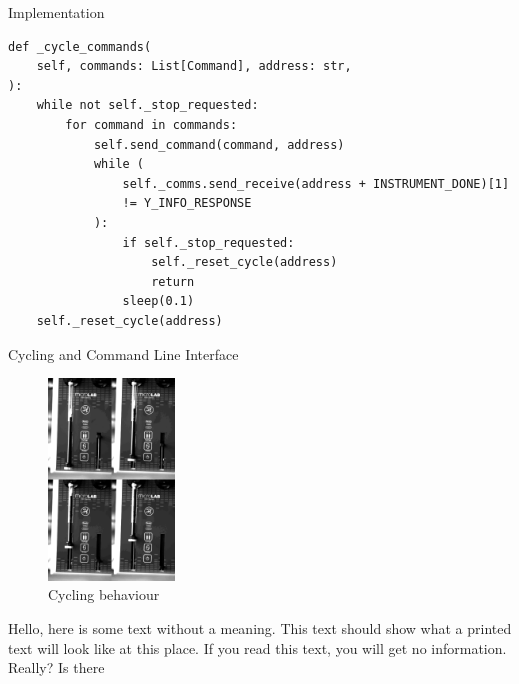 \documentclass[a0paper,landscape,fontscale=0.35]{baposter}
\begin{document}
\begin{poster}
\begin{posterbox}[name=implementation,column=1,span=2]{Implementation}
\begin{verbatim}
def _cycle_commands(
    self, commands: List[Command], address: str,
):
    while not self._stop_requested:
        for command in commands:
            self.send_command(command, address)
            while (
                self._comms.send_receive(address + INSTRUMENT_DONE)[1]
                != Y_INFO_RESPONSE
            ):
                if self._stop_requested:
                    self._reset_cycle(address)
                    return
                sleep(0.1)
    self._reset_cycle(address)
\end{verbatim}
\end{posterbox}
\begin{posterbox}[name=cycling,column=1,span=2,below=implementation]{Cycling and Command Line Interface}
\begin{multicols}{2}
\begin{figure}[H]
    \begin{center}
    \includegraphics[width=0.3\textwidth]{images/combined}
    \end{center}
    \vspace{-1.2em}
  \caption{Cycling behaviour}
\end{figure}
Hello, here is some text without a meaning.  This text should show what
a printed text will look like at this place.
If you read this text, you will get no information.  Really?  Is there

\end{multicols}
\end{posterbox}
\end{poster}
\end{document}
